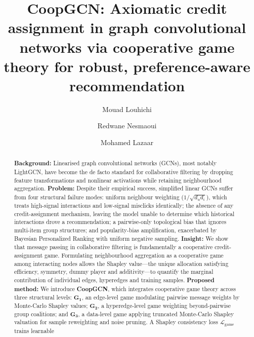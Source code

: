 \documentclass[final,5p,times,twocolumn]{elsarticle}
\begin{document}
\begin{frontmatter}

\title{CoopGCN: Axiomatic credit assignment in graph convolutional
networks via cooperative game theory for robust, preference-aware
recommendation}

\author[inst1]{Mouad Louhichi}
\author[inst1]{Redwane Nesmaoui}
\author[inst1]{Mohamed Lazaar}



\begin{abstract}
\textbf{Background:} Linearised graph convolutional networks (GCNs), most
notably LightGCN, have become the de facto standard for collaborative
filtering by dropping feature transformations and nonlinear activations while
retaining neighbourhood aggregation.
\textbf{Problem:} Despite their empirical success, simplified linear GCNs
suffer from four structural failure modes: uniform neighbour weighting
($1/\sqrt{d_u d_i}$), which treats high-signal interactions and low-signal
misclicks identically; the absence of any credit-assignment mechanism, leaving
the model unable to determine which historical interactions drove a
recommendation; a pairwise-only topological bias that ignores multi-item group
structures; and popularity-bias amplification, exacerbated by Bayesian
Personalized Ranking with uniform negative sampling.
\textbf{Insight:} We show that message passing in collaborative filtering is
fundamentally a cooperative credit-assignment game. Formulating neighbourhood
aggregation as a cooperative game among interacting nodes allows the Shapley
value---the unique allocation satisfying efficiency, symmetry, dummy player and
additivity---to quantify the marginal contribution of individual edges,
hyperedges and training samples.
\textbf{Proposed method:} We introduce \textbf{CoopGCN}, which integrates
cooperative game theory across three structural levels: $\mathbf{G_1}$, an
edge-level game modulating pairwise message weights by Monte-Carlo Shapley
values; $\mathbf{G_2}$, a hyperedge-level game weighting beyond-pairwise group
coalitions; and $\mathbf{G_3}$, a data-level game applying truncated
Monte-Carlo Shapley valuation for sample reweighting and noise pruning. A
Shapley consistency loss $\mathcal{L}_{\mathrm{game}}$ trains learnable

\end{abstract}
\end{frontmatter}
\end{document}
